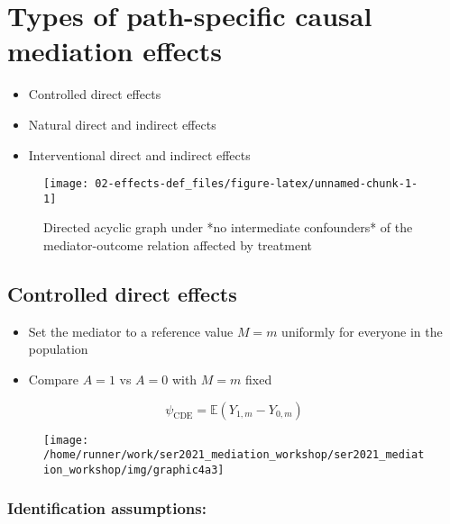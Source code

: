 \documentclass[
  12pt,
]{book}
\providecommand{\tightlist}{%
  \setlength{\itemsep}{0pt}\setlength{\parskip}{0pt}}
\theoremstyle{definition}
\theoremstyle{definition}
\theoremstyle{definition}
\newcommand{\E}{\mathbb{E}}
\newcommand{\1}{\mathbbm{1}}
\begin{document}
\hypertarget{estimands}{%
\chapter{Types of path-specific causal mediation effects}\label{estimands}}

\begin{itemize}
\tightlist
\item
  Controlled direct effects
\item
  Natural direct and indirect effects
\item
  Interventional direct and indirect effects
\end{itemize}

\begin{figure}

{\centering \texttt{[image: 02-effects-def\_files/figure-latex/unnamed-chunk-1-1]} 

}

\caption{Directed acyclic graph under *no intermediate confounders* of the mediator-outcome relation affected by treatment}\label{fig:unnamed-chunk-1}
\end{figure}

\hypertarget{controlled-direct-effects}{%
\section{Controlled direct effects}\label{controlled-direct-effects}}

\begin{itemize}
\tightlist
\item
  Set the mediator to a reference value \(M=m\) uniformly for everyone in the
  population
\item
  Compare \(A=1\) vs \(A=0\) with \(M=m\) fixed
\end{itemize}

\[\psi_{\text{CDE}} = \E(Y_{1,m} - Y_{0,m}) \]

\begin{figure}

{\centering \texttt{[image: /home/runner/work/ser2021\_mediation\_workshop/ser2021\_mediation\_workshop/img/graphic4a3]} 

}

\end{figure}

\hypertarget{identification-assumptions}{%
\subsection{Identification assumptions:}\label{identification-assumptions}}
\end{document}
